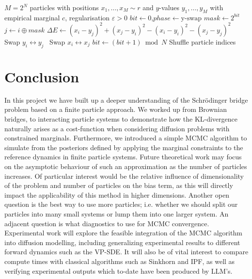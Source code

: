 \documentclass{article}
\begin{document}
\begin{algorithm}[h]
\caption{Bit-Flip MH Kernel for Regularised OT}
\label{alg:bitflip-mh}
\begin{algorithmic}[1]
\Require $M = 2^N$ particles with positions $x_1,\ldots,x_M \sim r$ and
         $y$-values $y_1,\ldots,y_M$ with empirical marginal $c$,
         regularisation $\varepsilon > 0$
\State $\mathit{bit} \gets 0$,\quad $\mathit{phase} \gets \text{y-swap}$
\Loop
    \State $\mathit{mask} \gets 2^{\mathit{bit}}$
        \State $j \gets i \oplus \mathit{mask}$
        \State $\Delta E \gets (x_i - y_j)^2 + (x_j - y_i)^2 - (x_i - y_i)^2 - (x_j - y_j)^2$
             Swap $y_i \leftrightarrow y_j$
            \Else\ Swap $x_i \leftrightarrow x_j$
            \EndIf
        \EndIf
    \EndFor
    \State $\mathit{bit} \gets (\mathit{bit} + 1) \bmod N$
     
        \State Shuffle particle indices
    \EndIf
\EndLoop
\end{algorithmic}
\end{algorithm}

\section{Conclusion}
In this project we have built up a deeper understanding of the Schrödinger
bridge problem based on a finite particle approach. We worked up from Brownian
bridges, to interacting particle systems to demonstrate how the KL-divergence
naturally arises as a cost-function when considering diffusion problems with
constrained marginals. Furthermore, we introduced a simple MCMC algorithm to
simulate from the posteriors defined by applying the marginal constraints to
the reference dynamics in finite particle systems. Future theoretical work
may focus on the asymptotic behaviour of such an approximation as the number of
particles increases. Of particular interest would be the relative influence of
dimensionality of the problem and number of particles on the bias term, as this
will directly impact the applicability of this method in higher dimensions.
Another open question is the best way to use more particles; i.e. whether we
should split our particles into many small systems or lump them into one larger
system. An adjacent question is what diagnostics to use for MCMC
convergence. Experimental work will explore the feasible integration of the MCMC
algorithm into diffusion modelling, including generalizing experimental results
to different forward dynamics such as the VP-SDE. It will also be of vital
interest to compare compute times with classical algorithms such as Sinkhorn and 
IPF, as well as verifying experimental outputs which to-date have been
produced by LLM's.
\end{document}
